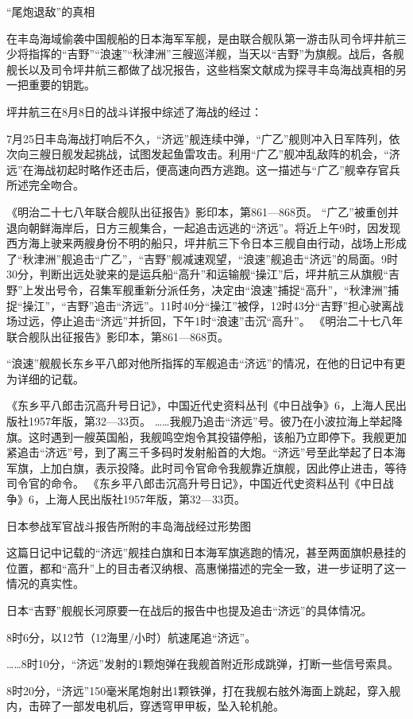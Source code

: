 \documentclass[12pt,UTF8]{ctexbook}
\begin{document}
“尾炮退敌”的真相

在丰岛海域偷袭中国舰船的日本海军军舰，是由联合舰队第一游击队司令坪井航三少将指挥的“吉野”“浪速”“秋津洲”三艘巡洋舰，当天以“吉野”为旗舰。战后，各舰舰长以及司令坪井航三都做了战况报告，这些档案文献成为探寻丰岛海战真相的另一把重要的钥匙。

坪井航三在8月8日的战斗详报中综述了海战的经过：

7月25日丰岛海战打响后不久，“济远”舰连续中弹，“广乙”舰则冲入日军阵列，依次向三艘日舰发起挑战，试图发起鱼雷攻击。利用“广乙”舰冲乱敌阵的机会，“济远”在海战初起时略作还击后，便高速向西方逃跑。这一描述与“广乙”舰幸存官兵所述完全吻合。

《明治二十七八年联合舰队出征报告》影印本，第861—868页。
“广乙”被重创并退向朝鲜海岸后，日方三舰集合，一起追击远逃的“济远”。将近上午9时，因发现西方海上驶来两艘身份不明的船只，坪井航三下令日本三舰自由行动，战场上形成了“秋津洲”舰追击“广乙”，“吉野”舰减速观望，“浪速”舰追击“济远”的局面。9时30分，判断出远处驶来的是运兵船“高升”和运输舰“操江”后，坪井航三从旗舰“吉野”上发出号令，召集军舰重新分派任务，决定由“浪速”捕捉“高升”，“秋津洲”捕捉“操江”，“吉野”追击“济远”。11时40分“操江”被俘，12时43分“吉野”担心驶离战场过远，停止追击“济远”并折回，下午1时“浪速”击沉“高升”。 《明治二十七八年联合舰队出征报告》影印本，第861—868页。

“浪速”舰舰长东乡平八郎对他所指挥的军舰追击“济远”的情况，在他的日记中有更为详细的记载。

《东乡平八郎击沉高升号日记》，中国近代史资料丛刊《中日战争》6，上海人民出版社1957年版，第32—33页。
……我舰乃追击“济远”号。彼乃在小波拉海上举起降旗。这时遇到一艘英国船，我舰鸣空炮令其投锚停船，该船乃立即停下。我舰更加紧追击“济远”号，到了离三千多码时发射船首的大炮。“济远”号至此举起了日本海军旗，上加白旗，表示投降。此时司令官命令我舰靠近旗舰，因此停止进击，等待司令官的命令。 《东乡平八郎击沉高升号日记》，中国近代史资料丛刊《中日战争》6，上海人民出版社1957年版，第32—33页。


日本参战军官战斗报告所附的丰岛海战经过形势图

这篇日记中记载的“济远”舰挂白旗和日本海军旗逃跑的情况，甚至两面旗帜悬挂的位置，都和“高升”上的目击者汉纳根、高惠悌描述的完全一致，进一步证明了这一情况的真实性。

日本“吉野”舰舰长河原要一在战后的报告中也提及追击“济远”的具体情况。

8时6分，以12节（12海里/小时）航速尾追“济远”。

……8时10分，“济远”发射的1颗炮弹在我舰首附近形成跳弹，打断一些信号索具。

8时20分，“济远”150毫米尾炮射出1颗铁弹，打在我舰右舷外海面上跳起，穿入舰内，击碎了一部发电机后，穿透穹甲甲板，坠入轮机舱。
\end{document}
